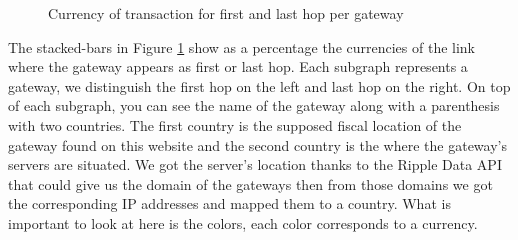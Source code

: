 \begin{figure}[h!]
  \caption{Currency of transaction for first and last hop per gateway}
    \label{fig:first_lap_hop_per_gateway}
\end{figure}

The stacked-bars in Figure \ref{fig:first_lap_hop_per_gateway} show as a percentage the currencies of the link where the gateway appears as first or last hop. Each subgraph represents a gateway, we distinguish the first hop on the left and last hop on the right. On top of each subgraph, you can see the name of the gateway along with a parenthesis with two countries. The first country is the supposed fiscal location of the gateway found on this website\cite{wipple} and the second country is the where the gateway's servers are situated. We got the server's location thanks to the Ripple Data API\cite{data-api} that could give us the domain of the gateways then from those domains we got the corresponding IP addresses and mapped them to a country. What is important to look at here is the colors, each color corresponds to a currency.

